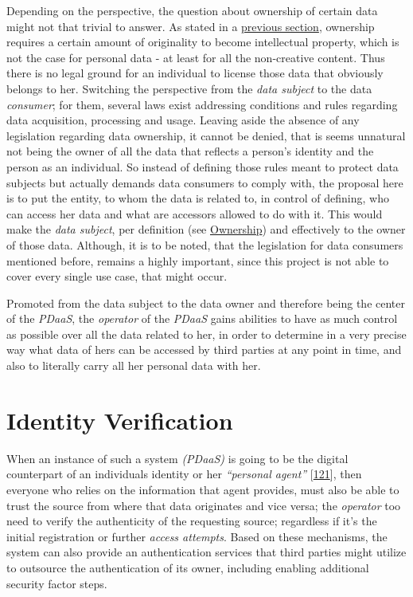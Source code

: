 \documentclass[12pt,english,a4paper,titlepage,cleardoublepage=empty,dottedtoc]{report}
\begin{document}
Depending on the perspective, the question about ownership of certain
data might not that trivial to answer. As stated in a
\protect\hyperlink{digital-identity-personal-data-and-ownership}{previous
section}, ownership requires a certain amount of originality to become
intellectual property, which is not the case for personal data - at
least for all the non-creative content. Thus there is no legal ground
for an individual to license those data that obviously belongs to her.
Switching the perspective from the \emph{data subject} to the data
\emph{consumer}; for them, several laws exist addressing conditions and
rules regarding data acquisition, processing and usage. Leaving aside
the absence of any legislation regarding data ownership, it cannot be
denied, that is seems unnatural not being the owner of all the data that
reflects a person's identity and the person as an individual. So instead
of defining those rules meant to protect data subjects but actually
demands data consumers to comply with, the proposal here is to put the
entity, to whom the data is related to, in control of defining, who can
access her data and what are accessors allowed to do with it. This would
make the \emph{data subject}, per definition (see
\protect\hyperlink{def-ownership}{Ownership}) and effectively to the
owner of those data. Although, it is to be noted, that the legislation
for data consumers mentioned before, remains a highly important, since
this project is not able to cover every single use case, that might
occur.

Promoted from the data subject to the data owner and therefore being the
center of the \emph{PDaaS}, the \emph{operator} of the \emph{PDaaS}
gains abilities to have as much control as possible over all the data
related to her, in order to determine in a very precise way what data of
hers can be accessed by third parties at any point in time, and also to
literally carry all her personal data with her.

\section{Identity Verification}\label{identity-verification}

When an instance of such a system \emph{(PDaaS)} is going to be the
digital counterpart of an individuals identity or her \emph{``personal
agent''}
{[}\protect\hyperlink{ref-book_2015_ethical-it-innovation}{121}{]}, then
everyone who relies on the information that agent provides, must also be
able to trust the source from where that data originates and vice versa;
the \emph{operator} too need to verify the authenticity of the
requesting source; regardless if it's the initial registration or
further \emph{access attempts}. Based on these mechanisms, the system
can also provide an authentication services that third parties might
utilize to outsource the authentication of its owner, including enabling
additional security factor steps.
\end{document}
